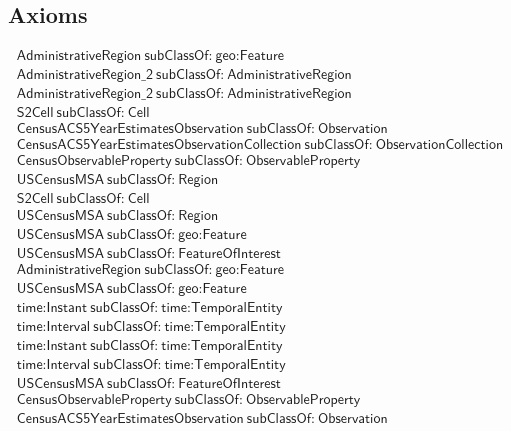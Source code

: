 \subsection{Axioms}
\begin{align}
  \textsf{AdministrativeRegion}~\textsf{subClassOf:}~\textsf{geo:Feature}\\
  \textsf{AdministrativeRegion\_2}~\textsf{subClassOf:}~\textsf{AdministrativeRegion}\\
  \textsf{AdministrativeRegion\_2}~\textsf{subClassOf:}~\textsf{AdministrativeRegion}\\
  \textsf{S2Cell}~\textsf{subClassOf:}~\textsf{Cell}\\
  \textsf{CensusACS5YearEstimatesObservation}~\textsf{subClassOf:}~\textsf{Observation}\\
  \textsf{CensusACS5YearEstimatesObservationCollection}~\textsf{subClassOf:}~\textsf{ObservationCollection}\\
  \textsf{CensusObservableProperty}~\textsf{subClassOf:}~\textsf{ObservableProperty}\\
  \textsf{USCensusMSA}~\textsf{subClassOf:}~\textsf{Region}\\
  \textsf{S2Cell}~\textsf{subClassOf:}~\textsf{Cell}\\
  \textsf{USCensusMSA}~\textsf{subClassOf:}~\textsf{Region}\\
  \textsf{USCensusMSA}~\textsf{subClassOf:}~\textsf{geo:Feature}\\
  \textsf{USCensusMSA}~\textsf{subClassOf:}~\textsf{FeatureOfInterest}\\
  \textsf{AdministrativeRegion}~\textsf{subClassOf:}~\textsf{geo:Feature}\\
  \textsf{USCensusMSA}~\textsf{subClassOf:}~\textsf{geo:Feature}\\
  \textsf{time:Instant}~\textsf{subClassOf:}~\textsf{time:TemporalEntity}\\
  \textsf{time:Interval}~\textsf{subClassOf:}~\textsf{time:TemporalEntity}\\
  \textsf{time:Instant}~\textsf{subClassOf:}~\textsf{time:TemporalEntity}\\
  \textsf{time:Interval}~\textsf{subClassOf:}~\textsf{time:TemporalEntity}\\
  \textsf{USCensusMSA}~\textsf{subClassOf:}~\textsf{FeatureOfInterest}\\
  \textsf{CensusObservableProperty}~\textsf{subClassOf:}~\textsf{ObservableProperty}\\
  \textsf{CensusACS5YearEstimatesObservation}~\textsf{subClassOf:}~\textsf{Observation}\\

\end{align}

